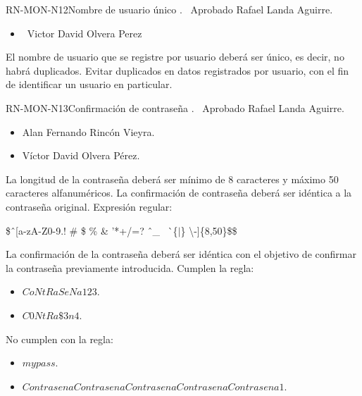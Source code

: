 %
\begin{BusinessRule}{RN-MON-N12}{Nombre de usuario único}
	{\bcIntegridad}
	{\btEnabler}
	{\blControlling}
	.
	\BRItem[Estado] \ Aprobado
	 Rafael Landa Aguirre.
	 \cdtEmpty
	\begin{itemize}
		\item \ Victor David Olvera Perez
	\end{itemize}
	\BRItem[Descripción] El nombre de usuario que se registre por usuario
	deberá ser único, es decir, no habrá duplicados.
	\BRItem[Motivación] Evitar duplicados en datos registrados por usuario, 
	con el fin de identificar un usuario en particular.
\end{BusinessRule}

%
\begin{BusinessRule}{RN-MON-N13}{Confirmación de contraseña}
	{\bcIntegridad}
	{\btEnabler}
	{\blControlling}
	.
	\BRItem[Estado] \ Aprobado
	 Rafael Landa Aguirre.
	 \cdtEmpty
	\begin{itemize}
		\item Alan Fernando Rincón Vieyra.
		\item Víctor David Olvera Pérez.
	\end{itemize}
	\BRItem[Descripción] La longitud de la contraseña deberá ser mínimo de 8 
	caracteres y máximo 50 caracteres alfanuméricos. La confirmación de 
	contraseña deberá ser idéntica a la contraseña original.
	\BRItem[Sentencia] Expresión regular:
	\begin{center}
		\$\^ \ [a-zA-Z0-9.! \# \$ \% \& '*+/=? \^ \ \_ \ \` \ \{$|$\} 
		\textbackslash -]\{8,50\}\$\$
	\end{center}
	\BRItem[Motivación] La confirmación de la contraseña deberá ser idéntica
	con el objetivo de confirmar la contraseña previamente introducida.
	 Cumplen la regla:
	\begin{itemize}
		\item $CoNtRaSeNa123$.
		\item $C0NtRa\$3n4$.
	\end{itemize}
	 No cumplen con la regla:
	\begin{itemize}
		\item $my pass$.
		\item $ContrasenaContrasenaContrasenaContrasenaContrasena1$.
	\end{itemize}
\end{BusinessRule}

